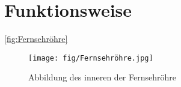 \section{Funktionsweise}

\ref{fig:Fernsehröhre} \cite{Abbildung}
\cite{Fernsehroehre}
\cite{Roehrenfernsehr}
\begin{figure}
    \centering
    \texttt{[image: fig/Fernsehröhre.jpg]}
    \caption{Abbildung des inneren der Fernsehröhre}
    \label{fig:Fernsehroehre}
\end{figure}
